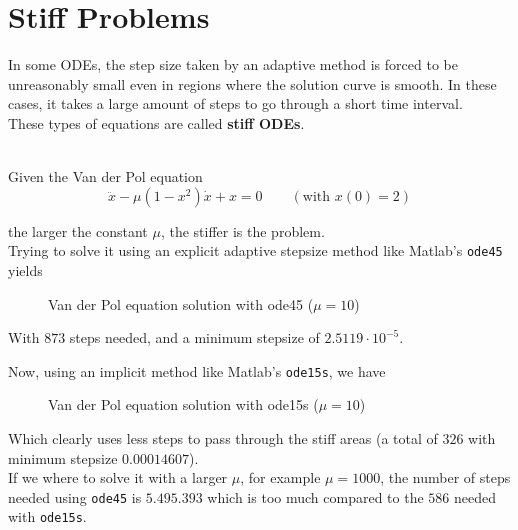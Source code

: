 \section{Stiff Problems}

In some ODEs, the step size taken by an adaptive method is forced to be unreasonably small even in regions where the solution curve is smooth. In these cases, it takes a large amount of steps to go through a short time interval.\\

These types of equations are called \textbf{stiff ODEs}.

\begin{example}\-\\
Given the Van der Pol equation $$\ddot{x} - \mu(1-x^2)\dot{x} + x = 0 \qquad (\text{with $x(0) = 2$})$$ 

the larger the constant $\mu$, the stiffer is the problem. \\

Trying to solve it using an explicit adaptive stepsize method like Matlab's \texttt{ode45} yields


\begin{figure}[h]
  \centering
  
  \caption{Van der Pol equation solution with ode45 ($\mu = 10$)}
\end{figure}

With $873$ steps needed, and a minimum stepsize of $2.5119\cdot 10^{-5}$.\\

\newpage

Now, using an implicit method like Matlab's \texttt{ode15s}, we have

\begin{figure}[h]
  \centering
  
  \caption{Van der Pol equation solution with ode15s ($\mu = 10$)}
\end{figure}

Which clearly uses less steps to pass through the stiff areas (a total of $326$ with minimum stepsize $0.00014607$).\\

If we where to solve it with a larger $\mu$, for example $\mu = 1000$, the number of steps needed using \texttt{ode45} is $5.495.393$ which is too much compared to the $586$ needed with \texttt{ode15s}.\\

\end{example}

